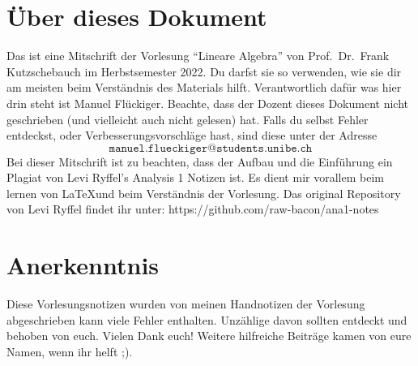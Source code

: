 \documentclass[../main.tex]{subfiles}
\begin{document}
\section*{Über dieses Dokument}
Das ist eine Mitschrift
der Vorlesung ``Lineare Algebra''
von Prof.\ Dr.\ Frank Kutzschebauch
im Herbstsemester 2022.
Du darfst sie so verwenden,
wie sie dir am meisten
beim Verständnis des Materials
hilft.
Verantwortlich dafür was
hier drin steht ist Manuel Flückiger.
Beachte, dass der Dozent dieses Dokument
nicht geschrieben (und vielleicht auch nicht gelesen) hat.
Falls du selbst Fehler entdeckst, oder Verbesserungsvorschläge hast,
sind diese unter der Adresse
\[
  \texttt{manuel.flueckiger@students.unibe.ch}
\]
Bei dieser Mitschrift ist zu beachten, dass der Aufbau und die 
Einführung ein Plagiat von Levi Ryffel's Analysis 1 Notizen ist.
Es dient mir vorallem beim lernen von \LaTeX und beim Verständnis der Vorlesung.
Das original Repository von Levi Ryffel findet ihr  
unter: https://github.com/raw-bacon/ana1-notes


\section*{Anerkenntnis}
Diese Vorlesungsnotizen wurden von meinen Handnotizen der Vorlesung abgeschrieben
kann viele Fehler enthalten.
Unzählige davon sollten entdeckt und behoben
von euch.
Vielen Dank euch! Weitere hilfreiche Beiträge kamen
von eure Namen, wenn ihr helft ;).
\end{document}
